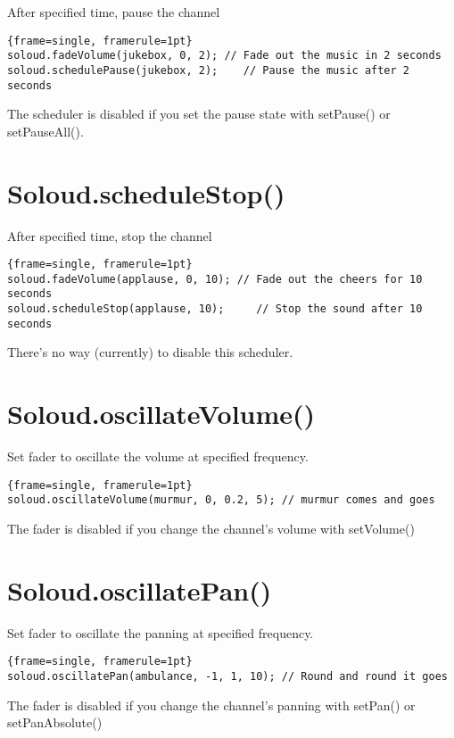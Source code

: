 After specified time, pause the channel

\begin{lstlisting}{frame=single, framerule=1pt}
soloud.fadeVolume(jukebox, 0, 2); // Fade out the music in 2 seconds
soloud.schedulePause(jukebox, 2);    // Pause the music after 2 seconds
\end{lstlisting}

The scheduler is disabled if you set the pause state with setPause() or setPauseAll().

\section{Soloud.scheduleStop()}

After specified time, stop the channel

\begin{lstlisting}{frame=single, framerule=1pt}
soloud.fadeVolume(applause, 0, 10); // Fade out the cheers for 10 seconds
soloud.scheduleStop(applause, 10);     // Stop the sound after 10 seconds
\end{lstlisting}

There's no way (currently) to disable this scheduler.

\section{Soloud.oscillateVolume()}

Set fader to oscillate the volume at specified frequency.

\begin{lstlisting}{frame=single, framerule=1pt}
soloud.oscillateVolume(murmur, 0, 0.2, 5); // murmur comes and goes
\end{lstlisting}
The fader is disabled if you change the channel's volume with setVolume()

\section{Soloud.oscillatePan()}

Set fader to oscillate the panning at specified frequency.

\begin{lstlisting}{frame=single, framerule=1pt}
soloud.oscillatePan(ambulance, -1, 1, 10); // Round and round it goes
\end{lstlisting}
The fader is disabled if you change the channel's panning with setPan() or setPanAbsolute()

